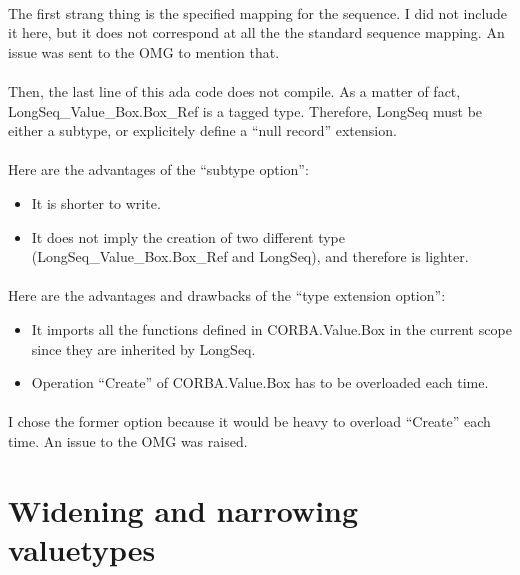 \paragraph{}The first strang thing is the specified mapping for the
sequence. I did not include it here, but it does not correspond at
all the the standard sequence mapping. An issue was sent to the OMG to
mention that.

\paragraph{}Then, the last line of this ada code does not compile. As
a matter of fact, LongSeq\_Value\_\-Box.\-Box\_Ref is a tagged
type. Therefore, LongSeq must be either a subtype, or explicitely
define a ``null record'' extension.

\paragraph{}Here are the advantages of the ``subtype option'':
\begin{itemize}
\item It is shorter to write.
\item It does not imply the creation of two different type
(LongSeq\_Value\_Box.Box\_Ref and LongSeq), and therefore is lighter.
\end{itemize}

\paragraph{}Here are the advantages and drawbacks of the ``type extension option'':
\begin{itemize}
\item It imports all the functions defined in CORBA.Value.Box in the
current scope since they are inherited by LongSeq.
\item Operation ``Create'' of CORBA.Value.Box has to be overloaded
each time.
\end{itemize}

\paragraph{} I chose the former option because it would be heavy to
overload ``Create'' each time. An issue to the OMG was raised.

\section{Widening and narrowing valuetypes}

